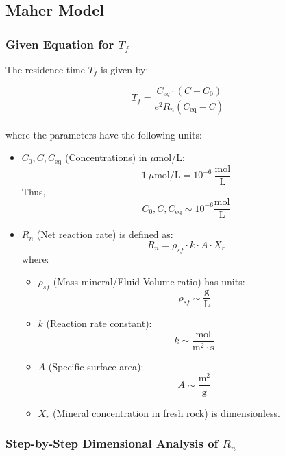 \newpage


\subsection*{Maher Model}

\subsubsection*{Given Equation for \( T_f \)}

The residence time \( T_f \) is given by:


\begin{equation}
    T_f = \frac{C_{eq} \cdot \left(C - C_0\right)}{e^2 R_n \left( C_{\text{eq}} - C \right)}
\end{equation}\\


where the parameters have the following units:

\begin{itemize}
    \item \( C_0, C, C_{\text{eq}} \) (Concentrations) in \( \mu \)mol/L:
    \[
    1~\mu\text{mol}/\text{L} = 10^{-6}~\frac{\text{mol}}{\text{L}}
    \]
    Thus,
    \[
    C_0, C, C_{\text{eq}} \sim 10^{-6} \frac{\text{mol}}{\text{L}}
    \]
    \item \( R_n \) (Net reaction rate) is defined as:
    \[
    R_n = \rho_{sf} \cdot k \cdot A \cdot X_r
    \]
    where:
    \begin{itemize}
        \item \( \rho_{sf} \) (Mass mineral/Fluid Volume ratio) has units:
        \[
        \rho_{sf} \sim \frac{\text{g}}{\text{L}}
        \]
        \item \( k \) (Reaction rate constant):
        \[
        k \sim \frac{\text{mol}}{\text{m}^2 \cdot \text{s}}
        \]
        \item \( A \) (Specific surface area):
        \[
        A \sim \frac{\text{m}^2}{\text{g}}
        \]
        \item \( X_r \) (Mineral concentration in fresh rock) is dimensionless.
    \end{itemize}
\end{itemize}

\subsubsection*{Step-by-Step Dimensional Analysis of \( R_n \)}

